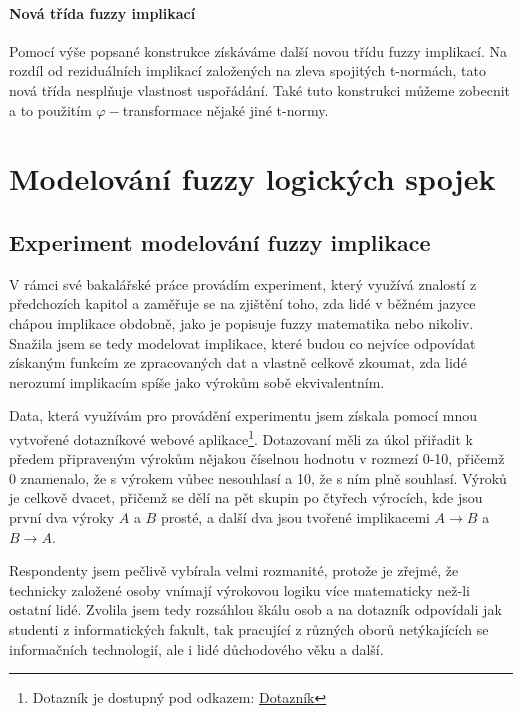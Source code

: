 \subsubsection{Nová třída fuzzy implikací}
Pomocí výše popsané konstrukce získáváme další novou třídu fuzzy implikací. Na rozdíl od reziduálních implikací založených na zleva spojitých t-normách, tato nová třída nespl\v nuje vlastnost uspořádání. Také tuto konstrukci můžeme zobecnit a to použitím $\varphi-$transformace nějaké jiné t-normy.


\chapter{Modelování fuzzy logických spojek}
\label{kap4}

\section{Experiment modelování fuzzy implikace}
V rámci své bakalářské práce provádím experiment, který využívá znalostí z předchozích kapitol a zaměřuje se na zjištění toho, zda lidé v běžném jazyce chápou implikace obdobně, jako je popisuje fuzzy matematika nebo nikoliv. Snažila jsem se tedy modelovat implikace, které budou co nejvíce odpovídat získaným funkcím ze zpracovaných dat a vlastně celkově zkoumat, zda lidé nerozumí implikacím spíše jako výrok\r um sobě ekvivalentním.

Data, která využívám pro provádění experimentu jsem získala pomocí mnou vytvořené dotazníkové webové aplikace\footnote{Dotazník je dostupný pod odkazem: \href{https://www.stud.fit.vutbr.cz/~xjirmu00/bp/}{Dotazník}}. Dotazovaní měli za \' ukol přiřadit k předem připraveným výrok\r um nějakou číselnou hodnotu v rozmezí 0-10, přičemž 0 znamenalo, že s výrokem v\r ubec nesouhlasí a 10, že s ním plně souhlasí. Výrok\r u je celkově dvacet, přičemž se dělí na pět skupin po čtyřech výrocích, kde jsou první dva výroky $A$ a $B$ prosté, a další dva jsou tvořené implikacemi $A \to B$ a $B \to A$.

Respondenty jsem pečlivě vybírala velmi rozmanité, protože je zřejmé, že technicky založené osoby vnímají výrokovou logiku více matematicky než-li ostatní lidé. Zvolila jsem tedy rozsáhlou škálu osob a na dotazník odpovídali jak studenti z informatických fakult, tak pracující z r\r uzných obor\r u netýkajících se informačních technologií, ale i lidé d\r uchodového věku a další.


